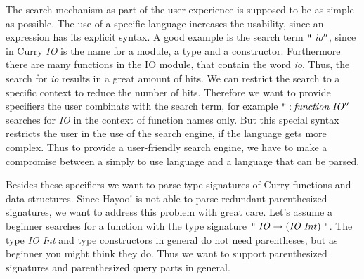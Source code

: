 \documentclass[%
	pdftex,%
	a4paper,%
	oneside,%
	chapterprefix,%
	headsepline,%
	12pt%
]{scrbook}
\newcommand{\Conid}[1]{\mathit{#1}}
\newcommand{\Varid}[1]{\mathit{#1}}
\begin{document}
The search mechanism as part of the user-experience is supposed to be
as simple as possible. The use of a specific language increases the
usability, since an expression has its explicit syntax. A good example
is the search term \ensuremath{\text{\tt ''}\;\Varid{io''}}, since in Curry \emph{IO} is the name for
a module, a type and a constructor. Furthermore there are many
functions in the IO module, that contain the word \emph{io}. Thus, the
search for \emph{io} results in a great amount of hits. We can
restrict the search to a specific context to reduce the number of
hits. Therefore we want to provide specifiers the user combinats with
the search term, for example \ensuremath{\text{\tt ''}\mathbin{:}\Varid{function}\;\Conid{IO''}} searches for \emph{IO}
in the context of function names only. But this special syntax
restricts the user in the use of the search engine, if the language
gets more complex. Thus to provide a user-friendly search engine, we
have to make a compromise between a simply to use language and a
language that can be parsed.

Besides these specifiers we want to parse type signatures of Curry
functions and data structures. Since Hayoo! is not able to parse
redundant parenthesized signatures, we want to address this problem
with great care. Let's assume a beginner searches for a function with
the type signature \ensuremath{\text{\tt ''}\;\Conid{IO}\to (\Conid{IO}\;\Conid{Int})\;\text{\tt ''}}. The type \emph{IO Int} and
type constructors in general do not need parentheses, but as beginner
you might think they do. Thus we want to support parenthesized
signatures and parenthesized query parts in general.
\end{document}
